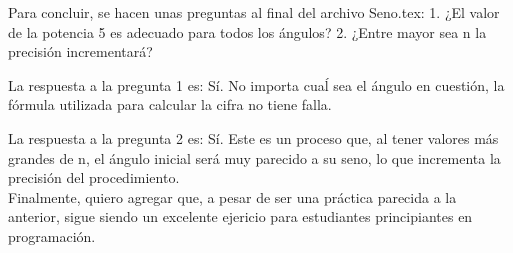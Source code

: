 \documentclass[]{article}
\begin{document}
Para concluir, se hacen unas preguntas al final del archivo Seno.tex: 1. ¿El valor de la potencia 5 es adecuado para todos los ángulos? 
2. ¿Entre mayor sea n la precisión incrementará?

La respuesta a la pregunta 1 es: Sí. No importa cuaĺ sea el ángulo en cuestión, la fórmula utilizada para calcular la cifra no tiene falla.

La respuesta a la pregunta 2 es: Sí. Este es un proceso que, al tener valores más grandes de n, el ángulo inicial será muy parecido a su seno, lo que incrementa la precisión del procedimiento.\\

Finalmente, quiero agregar que, a pesar de ser una práctica parecida a la anterior, sigue siendo un excelente ejericio para estudiantes principiantes en programación.
\section{}
\end{document}
